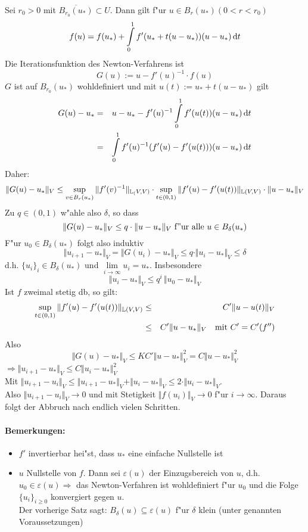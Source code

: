 \documentclass{scrartcl}
\begin{document}
\begin{Bew}
Sei $r_0 > 0$ mit $\overline{B_{r_0} (u_*)} \subset U$. Dann gilt f"ur $u \in B_r(u_*) (0 < r < r_0)$ 
$$ f(u) = f(u_*) + \int\limits_0^1 f'(u_* + t(u - u_*)) (u-u_*) \, \mathrm{d} t$$
Die Iterationsfunktion des Newton-Verfahrens ist
$$G(u) := u - f'(u)^{-1} \cdot f(u)$$
$G$ ist auf $B_{r_0}(u_*)$ wohldefiniert und mit $u(t) := u_* + t(u-u_*)$ gilt
\begin{eqnarray*}
G(u) - u_* & = & u - u_* - f'(u)^{-1} \int\limits_0^1 f'(u(t)) (u-u_*) \, \mathrm{d} t \\
& = & \int\limits_0^1 f'(u)^{-1} (f'(u) - f'(u(t))) (u - u_*) \, \mathrm{d} t
\end{eqnarray*}
Daher:
$$ \Vert G(u) - u_* \Vert_V \leq \sup\limits_{v \in B_r(u_*)} \Vert f'(v)^{-1} \Vert_{\mathbb{L}_(V,V)} \cdot \sup\limits_{t \in (0,1)} \Vert f'(u) - f'(u(t)) \Vert_{\mathbb{L}(V,V)} \cdot \Vert u - u_* \Vert_V$$
Zu $q \in (0,1)$ w"ahle also $\delta$, so dass
$$\Vert G(u) - u_* \Vert_V \leq q \cdot \Vert u - u_* \Vert_V \ \mathrm{ f"ur \ alle \ } u \in B_\delta(u_*)$$
F"ur $u_0 \in B_\delta(u_*)$ folgt also induktiv
$$\Vert u_{i+1} - u_* \Vert_V = \Vert G(u_i) - u_* \Vert_V \leq q \cdot \Vert u_i - u_* \Vert_V \leq \delta$$
d.h. $\{ u_i \}_i \in B_\delta(u_*)$ und $\lim\limits_{i \rightarrow \infty} u_i = u_*$. Insbesondere
$$\Vert u_i - u_* \Vert _V \leq q^i \, \Vert u_0 - u_* \Vert_V$$
Ist $f$ zweimal stetig db, so gilt:
\begin{eqnarray*}
\sup\limits_{t \in (0,1)} \Vert f'(u) - f'(u(t)) \Vert_{\mathbb{L}(V,V)} & \leq & C' \Vert u - u(t) \Vert_V \\
& \leq & C' \Vert u - u_* \Vert_V \quad \mathrm{mit \ } C' = C'(f'')
\end{eqnarray*}
Also 
$$\Vert G(u) - u_* \Vert_V \leq KC' \Vert u - u_* \Vert_V^2 = C \Vert u - u_* \Vert_V^2$$
$\Rightarrow \Vert u_{i+1} - u_* \Vert_V \leq C \Vert u_i - u_* \Vert_V^2$ \\
Mit $\Vert u_{i+1} - u_i \Vert_V \leq \Vert u_{i+1} - u_* \Vert_V + \Vert u_i - u_* \Vert_V \leq 2 \cdot \Vert u_i - u_* \Vert_V$. \\
Also $\Vert u_{i+1} - u_i \Vert_V \rightarrow 0$ und mit Stetigkeit $\Vert f(u_i) \Vert_V \rightarrow 0$ f"ur $i \rightarrow \infty$. Daraus folgt der Abbruch nach endlich vielen Schritten.
\end{Bew}

\paragraph*{Bemerkungen:}
\begin{itemize}
\item $f'$ invertierbar hei"st, dass $u_*$ eine einfache Nullstelle ist
\item $u$ Nullstelle von $f$. Dann sei $\varepsilon(u)$ der Einzugsbereich von $u$, d.h. $u_0 \in \varepsilon(u) \Rightarrow$ das Newton-Verfahren ist wohldefiniert f"ur $u_0$ und die Folge $\{ u_i \}_{i \geq 0}$ konvergiert gegen $u$. \\
Der vorherige Satz sagt: $B_\delta(u) \subseteq \varepsilon(u)$ f"ur $\delta$ klein (unter genannten Voraussetzungen)
\end{itemize}
\end{document}
